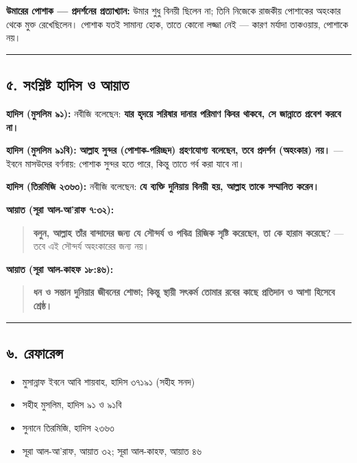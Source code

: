 \textbf{উমারের পোশাক — প্রদর্শনের প্রত্যাখ্যান:} উমার শুধু বিনয়ী ছিলেন না; তিনি নিজেকে রাজকীয় পোশাকের অহংকার থেকে মুক্ত রেখেছিলেন। পোশাক যতই সামান্য হোক, তাতে কোনো লজ্জা নেই — কারণ মর্যাদা তাকওয়ায়, পোশাকে নয়।

\medskip\hrule\medskip

\subsection*{৫. সংশ্লিষ্ট হাদিস ও আয়াত}

\textbf{হাদিস (মুসলিম ৯১):} নবীজি বলেছেন: \textbf{যার হৃদয়ে সরিষার দানার পরিমাণ কিবর থাকবে, সে জান্নাতে প্রবেশ করবে না।}

\textbf{হাদিস (মুসলিম ৯১বি):} \textbf{আল্লাহ সুন্দর (পোশাক-পরিচ্ছদ) গ্রহণযোগ্য বলেছেন, তবে প্রদর্শন (অহংকার) নয়।} — ইবনে মাসউদের বর্ণনায়: পোশাক সুন্দর হতে পারে, কিন্তু তাতে গর্ব করা যাবে না।

\textbf{হাদিস (তিরমিজি ২৩৬৩):} নবীজি বলেছেন: \textbf{যে ব্যক্তি দুনিয়ায় বিনয়ী হয়, আল্লাহ তাকে সম্মানিত করেন।}

\textbf{আয়াত (সূরা আল-আ'রাফ ৭:৩২):}
\begin{quote}
\textbf{বলুন, আল্লাহ তাঁর বান্দাদের জন্য যে সৌন্দর্য ও পবিত্র রিজিক সৃষ্টি করেছেন, তা কে হারাম করেছে?} — তবে এই সৌন্দর্য অহংকারের জন্য নয়।
\end{quote}

\textbf{আয়াত (সূরা আল-কাহফ ১৮:৪৬):}
\begin{quote}
\textbf{ধন ও সন্তান দুনিয়ার জীবনের শোভা; কিন্তু স্থায়ী সৎকর্ম তোমার রবের কাছে প্রতিদান ও আশা হিসেবে শ্রেষ্ঠ।}
\end{quote}

\medskip\hrule\medskip

\subsection*{৬. রেফারেন্স}

\begin{itemize}
\item মুসান্নাফ ইবনে আবি শায়বাহ, হাদিস ৩৭১৯১ (সহীহ সনদ)
\item সহীহ মুসলিম, হাদিস ৯১ ও ৯১বি
\item সুনানে তিরমিজি, হাদিস ২৩৬৩
\item সূরা আল-আ'রাফ, আয়াত ৩২; সূরা আল-কাহফ, আয়াত ৪৬
\end{itemize}


